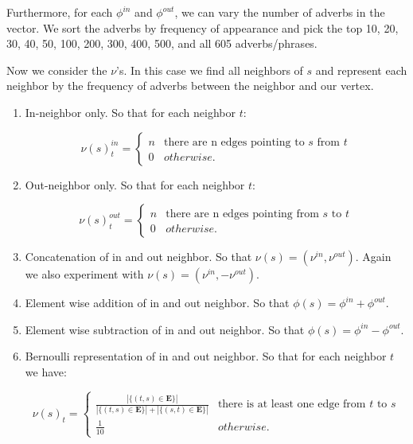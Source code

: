 Furthermore, for each $\phi^{in}$ and $\phi^{out}$, we can vary the number of adverbs in the vector. We sort the adverbs by frequency of appearance and pick the top 10, 20, 30, 40, 50, 100, 200, 300, 400, 500, and all 605 adverbs/phrases. 

Now we consider the $\nu$'s. In this case we find all neighbors of $s$ and represent each neighbor by the frequency of adverbs between the neighbor and our vertex. 

\begin{enumerate}
	\item In-neighbor only. So that for each neighbor $t$:

		\[   
		\nu(s)^{in}_t = \left\{
		\begin{array}{ll}
		      n & \text{there are n edges pointing to $s$ from $t$} \\
		      0 & otherwise.
		\end{array} 
		\right.
		\]

	\item Out-neighbor only. So that for each neighbor $t$:

		\[   
		\nu(s)^{out}_t = \left\{
		\begin{array}{ll}
		      n & \text{there are n edges pointing from $s$ to $t$} \\
		      0 & otherwise.
		\end{array} 
		\right. 
		\]

	\item Concatenation of in and out neighbor. So that $\nu(s) = (\nu^{in}, \nu^{out})$. Again we also experiment with $\nu(s) = (\nu^{in}, -\nu^{out})$.

	\item Element wise addition of in and out neighbor. So that $\phi(s) = \phi^{in} + \phi^{out}$.
	
	\item Element wise subtraction of in and out neighbor. So that $\phi(s) = \phi^{in} - \phi^{out}$.

	\item Bernoulli representation of in and out neighbor. So that for each neighbor $t$ we have:

		\[   
			\nu(s)_t = \left\{
			\begin{array}{ll}
			      \frac{|\{(t,s) \in \pmb{E}\}|}{|\{(t,s) \in \pmb{E}\}| + |\{(s,t) \in \pmb{E}\}|} & \text{there is at least one edge from $t$ to $s$} \\
			      \frac{1}{10} & otherwise.
			\end{array} 
			\right. 
		\]

\end{enumerate}

